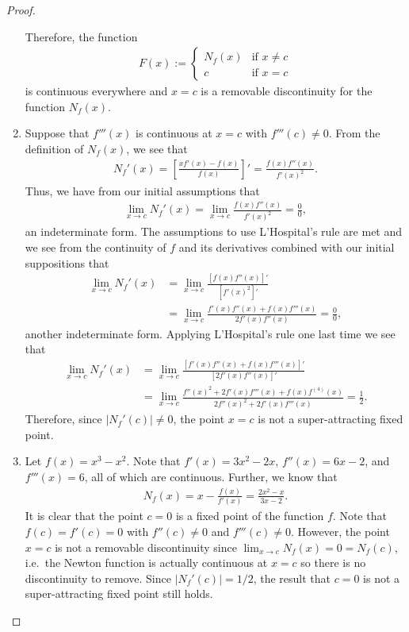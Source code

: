\begin{proof}
\begin{enumerate}
      Therefore, the function
      \begin{align*}
        F(x) :=
        \begin{cases}
          N_f(x) & \text{if $x \neq c$}\\
          c & \text{if $x = c$}
        \end{cases}
      \end{align*}
      is continuous everywhere and $x = c$ is a removable discontinuity for the
      function $N_f(x)$.

    \item Suppose that $f'''(x)$ is continuous at $x = c$ with $f'''(c) \neq 0$. From the definition of $N_f(x)$,
      we see that
      \begin{align*}
        N_f'(x) = \left[\frac{xf'(x) - f(x)}{f(x)}\right]' = \frac{f(x)f''(x)}{f'(x)^2}.
      \end{align*}
      Thus, we have from our initial assumptions that
      \begin{align*}
        \lim_{x\to c} N_f'(x) = \lim_{x\to c}\frac{f(x)f''(x)}{f'(x)^2} = \frac{0}{0},
      \end{align*}
      an indeterminate form. The assumptions to use L'Hospital's rule are met and we see
      from the continuity of $f$ and its derivatives combined with our initial suppositions that
      \begin{align*}
        \lim_{x\to c} N_f'(x) &= \lim_{x\to c}\frac{[f(x)f''(x)]'}{[f'(x)^2]'} \\
        &= \lim_{x\to c}\frac{f'(x)f''(x) + f(x)f'''(x)}{2f'(x)f''(x)} = \frac{0}{0},
      \end{align*}
      another indeterminate form. Applying L'Hospital's rule one last time we see
      that
      \begin{align*}
        \lim_{x\to c} N_f'(x) &= \lim_{x\to c}\frac{[f'(x)f''(x) + f(x)f'''(x)]'}{[2f'(x)f''(x)]'}\\
        &= \lim_{x\to c}\frac{f''(x)^2 + 2f'(x)f'''(x) + f(x) f^{(4)}(x)}{2f''(x)^2 + 2 f'(x)f'''(x)} = \frac{1}{2}.
      \end{align*}
      Therefore, since $|N_f'(c)| \neq 0$, the point $x=c$ is not a super-attracting
      fixed point.
    \item Let $f(x) = x^3 - x^2$. Note that $f'(x) = 3x^2 - 2x$, $f''(x) = 6x - 2$, and $f'''(x) = 6$, all of which are continuous.
      Further, we know that
      \begin{align*}
        N_f(x) = x - \frac{f(x)}{f'(x)} = \frac{2x^2 - x}{3x - 2}.
      \end{align*}
      It is clear that the point $c = 0$ is a fixed point of the function $f$. Note that
      $f(c) = f'(c) = 0$ with $f''(c) \neq 0$ and $f'''(c) \neq 0$. However, the point $x=c$ is
      not a removable discontinuity since $\lim_{x\to c}N_f(x) = 0 = N_f(c)$, i.e.\
      the Newton function is actually continuous at $x=c$ so there is no discontinuity to remove. Since $|N_f'(c)| = 1/2$,
      the result that $c = 0$ is not a super-attracting fixed point still holds.

  \end{enumerate}
\end{proof}
\newpage
